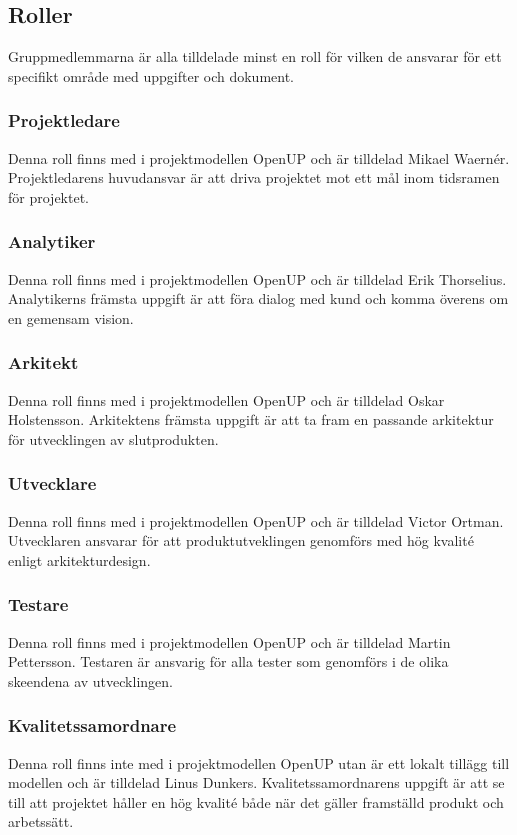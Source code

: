 \subsection{Roller}
Gruppmedlemmarna är alla tilldelade minst en roll för vilken de ansvarar för ett specifikt område med uppgifter och dokument.

\subsubsection{Projektledare}
Denna roll finns med i projektmodellen OpenUP och är tilldelad Mikael Waernér. Projektledarens huvudansvar är att driva projektet mot ett mål inom tidsramen för projektet.

\subsubsection{Analytiker}
Denna roll finns med i projektmodellen OpenUP och är tilldelad Erik Thorselius. Analytikerns främsta uppgift är att föra dialog med kund och komma överens om en gemensam vision.

\subsubsection{Arkitekt}
Denna roll finns med i projektmodellen OpenUP och är tilldelad Oskar Holstensson. Arkitektens främsta uppgift är att ta fram en passande arkitektur för utvecklingen av slutprodukten.

\subsubsection{Utvecklare}
Denna roll finns med i projektmodellen OpenUP och är tilldelad Victor Ortman. Utvecklaren ansvarar för att produktutveklingen genomförs med hög kvalité enligt arkitekturdesign.

\subsubsection{Testare}
Denna roll finns med i projektmodellen OpenUP och är tilldelad Martin Pettersson. Testaren är ansvarig för alla tester som genomförs i de olika skeendena av utvecklingen.

\subsubsection{Kvalitetssamordnare}
Denna roll finns inte med i projektmodellen OpenUP utan är ett lokalt tillägg till modellen och är tilldelad Linus Dunkers. Kvalitetssamordnarens uppgift är att se till att projektet håller en hög kvalité både när det gäller framställd produkt och arbetssätt.

